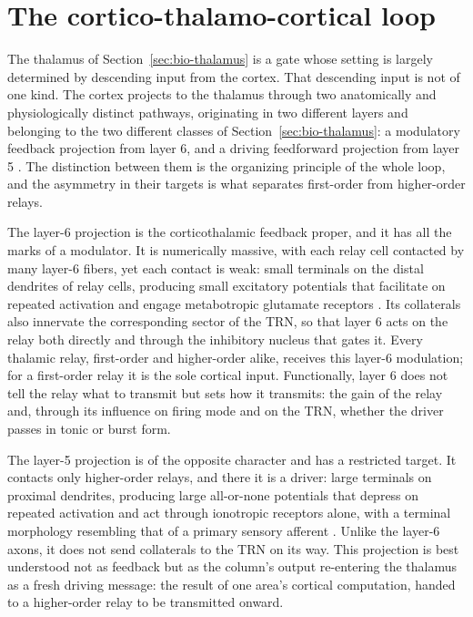 \section{The cortico-thalamo-cortical loop}
\label{sec:bio-loop}

The thalamus of Section~\ref{sec:bio-thalamus} is a gate whose setting is largely determined by descending input from the cortex. That 
descending input is not of one kind. The cortex projects to the thalamus through two anatomically and physiologically distinct pathways,
 originating in two different layers and belonging to the two different classes of Section~\ref{sec:bio-thalamus}: a modulatory 
 feedback projection from layer 6, and a driving feedforward projection from layer 5 \parencite{sherman1998, sherman2013}. 
 The distinction between them is the organizing principle of the whole loop, and the asymmetry in their targets is what separates 
 first-order from higher-order relays.

The layer-6 projection is the corticothalamic feedback proper, and it has all the marks of a modulator. It is numerically massive, with each relay cell contacted by many layer-6 fibers, yet each contact is weak: small terminals on the distal dendrites of relay cells,
 producing small excitatory potentials that facilitate on repeated activation and engage metabotropic glutamate receptors 
 \parencite{sherman2013, shepherd2018}. Its collaterals also innervate the corresponding sector of the TRN, so that layer 6 acts on the
  relay both directly and through the inhibitory nucleus that gates it. Every thalamic relay, first-order and higher-order alike, 
  receives this layer-6 modulation; for a first-order relay it is the sole cortical input. Functionally, layer 6 does not tell the 
  relay what to transmit but sets how it transmits: the gain of the relay and, through its influence on firing mode and on the TRN, 
  whether the driver passes in tonic or burst form.

The layer-5 projection is of the opposite character and has a restricted target. It contacts only higher-order relays, and there it is 
a driver: large terminals on proximal dendrites, producing large all-or-none potentials that depress on repeated activation and act 
through ionotropic receptors alone, with a terminal morphology resembling that of a primary sensory afferent \parencite{sherman2013}. 
Unlike the layer-6 axons, it does not send collaterals to the TRN on its way. This projection is best understood not as feedback but 
as the column's output re-entering the thalamus as a fresh driving message: the result of one area's cortical computation, handed to 
a higher-order relay to be transmitted onward.

